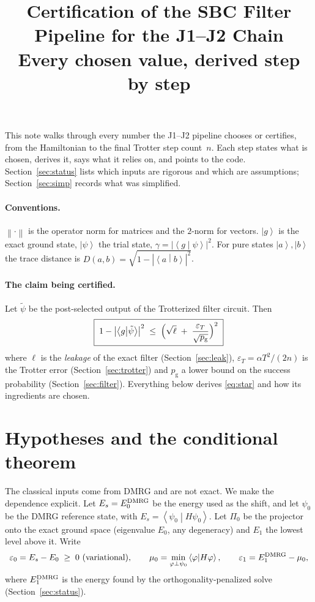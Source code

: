 \documentclass[11pt]{article}
\title{Certification of the SBC Filter Pipeline for the J1--J2 Chain\\[2pt]
\large Every chosen value, derived step by step}
\author{}
\date{}
\theoremstyle{definition}
\newcommand{\norm}[1]{\left\lVert #1\right\rVert}
\newcommand{\abs}[1]{\left\lvert #1\right\rvert}
\newcommand{\ket}[1]{\left\lvert #1\right\rangle}
\newcommand{\braket}[2]{\left\langle #1 \middle| #2\right\rangle}
\newcommand{\eps}{\varepsilon}
\newcommand{\pg}{p_{\mathrm g}}
\begin{document}
\maketitle

\noindent This note walks through every number the J1--J2 pipeline chooses or certifies, from the Hamiltonian to the
final Trotter step count~$n$. Each step states what is chosen, derives it, says what it relies on, and points to the
code. Section~\ref{sec:status} lists which inputs are rigorous and which are assumptions; Section~\ref{sec:simp}
records what was simplified.

\paragraph{Conventions.} $\norm{\cdot}$ is the operator norm for matrices and the $2$-norm for vectors.
$\ket{g}$ is the exact ground state, $\ket{\psi}$ the trial state, $\gamma=\abs{\braket{g}{\psi}}^2$. For pure
states $\ket{a},\ket{b}$ the trace distance is $D(a,b)=\sqrt{1-\abs{\braket{a}{b}}^2}$.

\paragraph{The claim being certified.} Let $\tilde\psi$ be the post-selected output of the Trotterized filter circuit.
Then
\begin{equation}\label{eq:star}
  \boxed{\;1-\abs{\braket{g}{\tilde\psi}}^2 \;\le\; \Bigl(\sqrt{\ell}\;+\;\frac{\eps_T}{\sqrt{\pg}}\Bigr)^{2}\;}
\end{equation}
where $\ell$ is the \emph{leakage} of the exact filter (Section~\ref{sec:leak}), $\eps_T=\alpha T^2/(2n)$ is the Trotter
error (Section~\ref{sec:trotter}) and $\pg$ a lower bound on the success probability (Section~\ref{sec:filter}).
Everything below derives \eqref{eq:star} and how its ingredients are chosen.

\section{Hypotheses and the conditional theorem}\label{sec:thm}
The classical inputs come from DMRG and are not exact. We make the dependence explicit. Let $E_s=E_0^{\rm DMRG}$ be the energy used
as the shift, and let $\psi_0$ be the DMRG reference state, with $E_s=\braket{\psi_0}{H\psi_0}$. Let $\Pi_0$ be the projector onto the
exact ground space (eigenvalue $E_0$, any degeneracy) and $E_1$ the lowest level above it. Write
\[
  \varepsilon_0=E_s-E_0\;\ge\;0\ \text{(variational)},\qquad
  \mu_0=\min_{\varphi\perp\psi_0}\braket{\varphi}{H\varphi},\qquad
  \varepsilon_1=E_1^{\rm DMRG}-\mu_0 ,
\]
where $E_1^{\rm DMRG}$ is the energy found by the orthogonality-penalized solve (Section~\ref{sec:status}).
\end{document}
